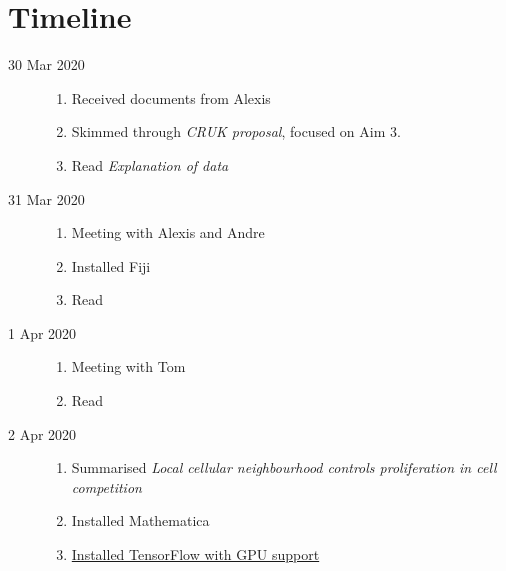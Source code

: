\section{Timeline}
\label{sec:timeline}

\begin{description}
    \item[30 Mar 2020] \mbox{}
    \begin{enumerate}
        \item Received documents from Alexis
        \item Skimmed through \textit{CRUK proposal}, focused on Aim 3.
        \item Read \textit{Explanation of data}
    \end{enumerate}
    
    \item[31 Mar 2020] \mbox{}
    \begin{enumerate}
        \item Meeting with Alexis and Andre
        \item Installed Fiji
        \item Read \cite{bove2017local}
    \end{enumerate}

    \item[1 Apr 2020] \mbox{}
    \begin{enumerate}
        \item Meeting with Tom
        \item Read \cite{bove2017local}
    \end{enumerate}
    
    \item[2 Apr 2020] \mbox{}
    \begin{enumerate}
        \item Summarised \cite{bove2017local} \textit{Local cellular neighbourhood controls proliferation in cell competition}
        \item Installed Mathematica
        \item \href{https://gist.github.com/qin-yu/d3619a68d209dd1feefd7385e43c3fc4}{Installed TensorFlow with GPU support}
    \end{enumerate}
\end{description}
